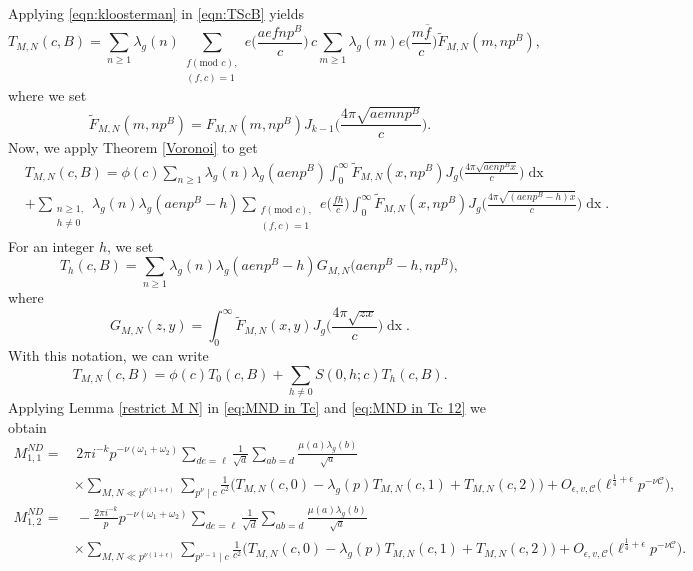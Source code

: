 \documentclass[12pt]{amsart}
\theoremstyle{plain}
\theoremstyle{definition}
\begin{document}
Applying \eqref{eqn:kloosterman} in \eqref{eqn:TScB} yields
    \[
    T_{M,N}(c, B) 
    = \sum_{ n \geq 1}  \lambda_g(n)
    \sum_{\substack{f(\text{mod } c),\\ (f, c)=1}}
    e\Big(\frac{aefnp^B}{c}\Big)
    \, c\sum_{m \geq 1}
    \lambda_g(m) e\Big(\frac{m\overline{f}}{c}\Big)\tilde{F}_{M, N}(m, np^B),
    \]
where we set
    \[
    \tilde{F}_{M, N}(m, np^B)=
    F_{M, N}(m, np^B) 
    J_{k-1}\Big(\frac{4\pi\sqrt{aemnp^B}}{c}\Big).
    \]
Now, we apply Theorem \ref{Voronoi} to get
    \begin{align*}
    &T_{M,N}(c, B) 
    =  \phi(c)     \sum_{ n \geq 1}  \lambda_g(n) \lambda_g(aen p^B)
    \int_0^\infty \tilde{F}_{M, N}(x, np^B)
    J_g\Big(\tfrac{4\pi\sqrt{aenp^B x}}{c} \Big) \mathop{dx} \\
    &+\sum_{\substack{n\geq 1, \\ h\neq 0}}  
    \lambda_g(n) \lambda_g(aenp^B-h)
    \sum_{\substack{f(\text{mod } c),\\ (f, c)=1}}
    e\Big(\frac{fh}{c}\Big)
    \int_0^\infty \tilde{F}_{M, N}(x, np^B ) 
    J_g\Big(\tfrac{4\pi\sqrt{(aenp^B-h)x}}{c} \Big) \mathop{dx} .
    \end{align*}
For an integer $h$, we set
    \begin{equation*}\label{eqn:Th-def}
    T_{h}(c, B)
    =  \sum_{n\geq 1}  
    \lambda_g(n) \lambda_g(aenp^B - h)
    G_{M,N}\big(aenp^B-h, np^B\big) ,
    \end{equation*}
    where  \begin{equation}\label{eqn:G-def}
    G_{M,N}(z, y)= \int_0^\infty \tilde{F}_{M, N}(x, y) 
    J_g\Big(\frac{4\pi\sqrt{zx}}{c} \Big) \mathop{dx}.
    \end{equation}
With this notation, we can write
    \begin{equation}\label{eq:TS-cB}
    T_{M,N}(c, B)
    =\phi(c) 
    T_0(c,B)
    +  \sum_{h\neq 0} S(0, h ;c) 
    T_{h}(c, B) .
    \end{equation}
Applying Lemma \ref{restrict M N} in \eqref{eq:MND in Tc} and \eqref{eq:MND in Tc 12} we obtain    \begin{align*}
    M^{ND}_{1, 1}
    = &\, 2\pi i^{-k} p^{-\nu (\omega_1+\omega_2)}
    \sum_{de=\ell} \frac{1}{\sqrt d}
    \sum_{ab=d} \frac{\mu(a) \lambda_g(b)}{\sqrt a} \\
    &\times 
    \sum_{M, N \ll p^{\nu(1+\epsilon)}}\sum_{p^\nu \mid c} \frac{1}{c^2}\Big(T_{M,N}(c, 0) - \lambda_g(p)T_{M,N}(c, 1)+T_{M,N}(c, 2) \Big) 
    +O_{\epsilon, v, \mathcal{C}}\big(  \ell^{\frac{1}{4}+\epsilon} p^{-\nu \mathcal{C}} \big), 
    \\
    M^{ND}_{1, 2}
    = &\, -\frac{2\pi i^{-k}}{p} p^{-\nu (\omega_1+\omega_2)}
    \sum_{de=\ell} \frac{1}{\sqrt d}
    \sum_{ab=d} \frac{\mu(a) \lambda_g(b)}{\sqrt a} \\
    &\times 
    \sum_{M, N \ll p^{\nu(1+\epsilon)}}\sum_{p^{\nu-1} \mid c} \frac{1}{c^2}\Big(T_{M,N}(c, 0) - \lambda_g(p)T_{M,N}(c, 1)+T_{M,N}(c, 2) \Big)
    +O_{\epsilon, v, \mathcal{C}}\big( \ell^{\frac{1}{4}+\epsilon} p^{-\nu \mathcal{C}} \big). 
    \end{align*}
\end{document}
